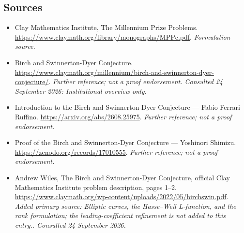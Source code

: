 \documentclass[11pt]{article}
\begin{document}
\subsection{Sources}
\begin{itemize}
\item[S1]Clay Mathematics Institute, The Millennium Prize Problems.
\url{https://www.claymath.org/library/monographs/MPPc.pdf}.
\textit{Formulation source.}
\item[S2]Birch and Swinnerton-Dyer Conjecture.
\url{https://www.claymath.org/millennium/birch-and-swinnerton-dyer-conjecture/}.
\textit{Further reference; not a proof endorsement. Consulted 24 September 2026: Institutional overview only.}
\item[S3]Introduction to the Birch and Swinnerton-Dyer Conjecture — Fabio Ferrari Ruffino.
\url{https://arxiv.org/abs/2608.25975}.
\textit{Further reference; not a proof endorsement.}
\item[S4]Proof of the Birch and Swinnerton-Dyer Conjecture — Yoshinori Shimizu.
\url{https://zenodo.org/records/17010555}.
\textit{Further reference; not a proof endorsement.}
\item[E1]Andrew Wiles, The Birch and Swinnerton-Dyer Conjecture, official Clay Mathematics Institute problem description, pages 1–2.
\url{https://www.claymath.org/wp-content/uploads/2022/05/birchswin.pdf}.
\textit{Added primary source: Elliptic curves, the Hasse–Weil L-function, and the rank formulation; the leading-coefficient refinement is not added to this entry.. Consulted 24 September 2026.}
\end{itemize}
\end{document}
